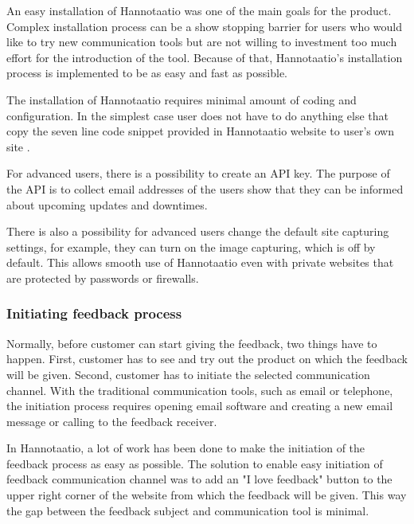 \documentclass[english,12pt,a4paper,pdftex]{article}
\begin{document}
An easy installation of Hannotaatio was one of the main goals for the product. Complex installation process can be a show stopping barrier for users who would like to try new communication tools but are not willing to investment too much effort for the introduction of the tool. Because of that, Hannotaatio's installation process is implemented to be as easy and fast as possible.

The installation of Hannotaatio requires minimal amount of coding and configuration. In the simplest case user does not have to do anything else that copy the seven line code snippet provided in Hannotaatio website to user's own site \citep{hannotaatio}.

For advanced users, there is a possibility to create an \ac{API} key. The purpose of the \ac{API} is to collect email addresses of the users show that they can be informed about upcoming updates and downtimes.

There is also a possibility for advanced users change the default site capturing settings, for example, they can turn on the image capturing, which is off by default. This allows smooth use of Hannotaatio even with private websites that are protected by passwords or firewalls.

\subsubsection{Initiating feedback process}

Normally, before customer can start giving the feedback, two things have to happen. First, customer has to see and try out the product on which the feedback will be given. Second, customer has to initiate the selected communication channel. With the traditional communication tools, such as email or telephone, the initiation process requires opening email software and creating a new email message or calling to the feedback receiver.

In Hannotaatio, a lot of work has been done to make the initiation of the feedback process as easy as possible. The solution to enable easy initiation of feedback communication channel was to add an "I love feedback" button to the upper right corner of the website from which the feedback will be given. This way the gap between the feedback subject and communication tool is minimal.
\end{document}
